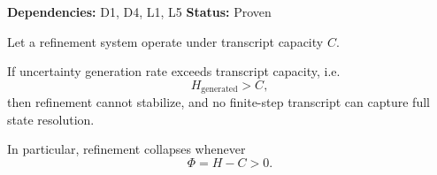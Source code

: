 \begin{theorem}
\textbf{Dependencies: } D1, D4, L1, L5
\textbf{Status: } Proven

Let a refinement system operate under transcript capacity $C$.

If uncertainty generation rate exceeds transcript capacity, i.e.
\[
H_{\text{generated}} > C,
\]
then refinement cannot stabilize, and no finite-step transcript can capture full state resolution.

In particular, refinement collapses whenever
\[
\Phi = H - C > 0.
\]
\end{theorem}
